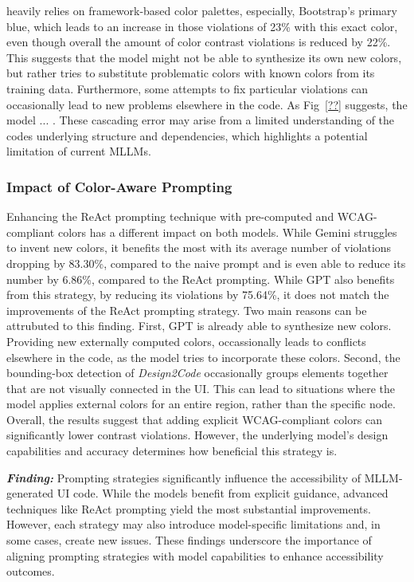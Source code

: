 heavily relies on framework-based color palettes, 
especially, Bootstrap's primary blue, which leads to 
an increase in those violations of 23\% with 
this exact color, even though overall the amount 
of color contrast violations is reduced by 22\%. 
This suggests that the model might not be able to 
synthesize its own new colors, but rather tries to
substitute problematic colors with known colors 
from its training data.
Furthermore, some
attempts to fix particular violations can 
occasionally lead to new problems elsewhere in 
the code. As Fig~\ref{??} suggests, the model ... .
These cascading error may arise from a limited 
understanding of the codes underlying structure and 
dependencies, which highlights a potential limitation 
of current MLLMs.

\subsubsection{Impact of Color-Aware Prompting}
Enhancing the ReAct prompting technique with pre-computed 
and WCAG-compliant colors has a different impact on both models.
While Gemini struggles to invent new colors, it 
benefits the most with its average number of violations 
dropping by 83.30\%, compared to the naive prompt and 
is even able to reduce its number by 6.86\%, compared to 
the ReAct prompting. While GPT also benefits from this 
strategy, by reducing its violations by 75.64\%, it does not
match the improvements of the ReAct prompting strategy.\newline
Two main reasons can be attrubuted to this finding. First,
GPT is already able to synthesize new colors. Providing 
new externally computed colors, occassionally leads to 
conflicts elsewhere in the code, as the model tries to 
incorporate these colors. Second, the bounding-box 
detection of \textit{Design2Code} occasionally groups elements
together that are not visually connected in the UI. This 
can lead to situations where the model applies external 
colors for an entire region, rather than the specific node.
Overall, the results suggest that adding explicit WCAG-compliant 
colors can significantly lower contrast violations. However, 
the underlying model's design capabilities and accuracy 
determines how beneficial this strategy is.


\begin{center}
\begin{tcolorbox}[colback=black!5!white,colframe=black!75!black,bottom=-0.05pt,top=-0.05pt]
\textit{\textbf{Finding:}} Prompting strategies significantly 
influence the accessibility of MLLM-generated UI code. 
While the models benefit from explicit guidance, 
advanced techniques like ReAct prompting yield the most 
substantial improvements. However, each strategy may also 
introduce model-specific limitations and, in some cases, 
create new issues. These findings underscore the importance 
of aligning prompting strategies with model capabilities 
to enhance accessibility outcomes.
\end{tcolorbox}
\end{center}


